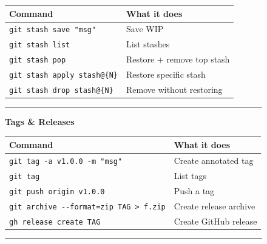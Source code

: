 \documentclass[
  9pt,
  a4paper,
  DIV=11,
  numbers=noendperiod]{scrartcl}
\begin{document}
\begin{figure}
\begin{minipage}{0.50\linewidth}
\begin{longtable}[]{@{}ll@{}}
\toprule\noalign{}
Command & What it does \\
\midrule\noalign{}
\endhead
\bottomrule\noalign{}
\endlastfoot
\texttt{git\ stash\ save\ "msg"} & Save WIP \\
\texttt{git\ stash\ list} & List stashes \\
\texttt{git\ stash\ pop} & Restore + remove top stash \\
\texttt{git\ stash\ apply\ stash@\{N\}} & Restore specific stash \\
\texttt{git\ stash\ drop\ stash@\{N\}} & Remove without restoring \\
\end{longtable}

\end{minipage}%
\newline
\begin{minipage}{0.50\linewidth}

\begin{center}\rule{0.5\linewidth}{0.5pt}\end{center}

\end{minipage}%
%
\begin{minipage}{0.50\linewidth}
\textbf{Tags \& Releases}\end{minipage}%
\newline
\begin{minipage}{0.50\linewidth}

\begin{longtable}[]{@{}ll@{}}
\toprule\noalign{}
Command & What it does \\
\midrule\noalign{}
\endhead
\bottomrule\noalign{}
\endlastfoot
\texttt{git\ tag\ -a\ v1.0.0\ -m\ "msg"} & Create annotated tag \\
\texttt{git\ tag} & List tags \\
\texttt{git\ push\ origin\ v1.0.0} & Push a tag \\
\texttt{git\ archive\ -\/-format=zip\ TAG\ \textgreater{}\ f.zip} &
Create release archive \\
\texttt{gh\ release\ create\ TAG} & Create GitHub release \\
\end{longtable}

\end{minipage}%
%
\begin{minipage}{0.50\linewidth}

\begin{center}\rule{0.5\linewidth}{0.5pt}\end{center}


\end{minipage}
\end{figure}
\end{document}
